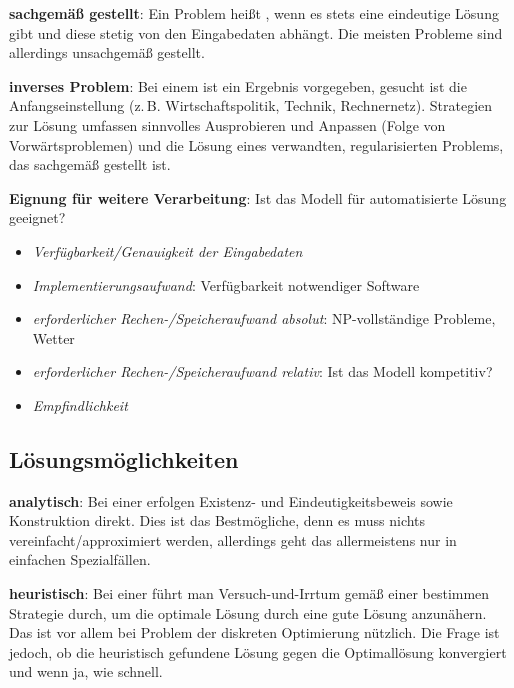 \textbf{sachgemäß gestellt}:
Ein Problem heißt , wenn es stets eine eindeutige Lösung gibt und
diese stetig von den Eingabedaten abhängt.
Die meisten Probleme sind allerdings unsachgemäß gestellt.

\textbf{inverses Problem}:
Bei einem  ist ein Ergebnis vorgegeben, gesucht ist die
Anfangseinstellung
(z.\,B. Wirtschaftspolitik, Technik, Rechnernetz).
Strategien zur Lösung umfassen sinnvolles Ausprobieren und Anpassen (Folge von Vorwärtsproblemen)
und die Lösung eines verwandten, regularisierten Problems, das sachgemäß gestellt ist.

\linie

\textbf{Eignung für weitere Verarbeitung}:
Ist das Modell für automatisierte Lösung geeignet?
\begin{itemize}
    \item
    \emph{Verfügbarkeit/Genauigkeit der Eingabedaten}

    \item
    \emph{Implementierungsaufwand}:
    Verfügbarkeit notwendiger Software

    \item
    \emph{erforderlicher Rechen-/Speicheraufwand absolut}:
    NP-vollständige Probleme, Wetter

    \item
    \emph{erforderlicher Rechen-/Speicheraufwand relativ}:
    Ist das Modell kompetitiv?

    \item
    \emph{Empfindlichkeit}
\end{itemize}

\subsection{%
    Lösungsmöglichkeiten%
}

\textbf{analytisch}:
Bei einer  erfolgen
Existenz- und Eindeutigkeitsbeweis sowie Konstruktion direkt.
Dies ist das Bestmögliche, denn es muss nichts vereinfacht/approximiert werden,
allerdings geht das allermeistens nur in einfachen Spezialfällen.

\textbf{heuristisch}:
Bei einer  führt man Versuch-und-Irrtum gemäß einer bestimmen
Strategie durch, um die optimale Lösung durch eine gute Lösung anzunähern.
Das ist vor allem bei Problem der diskreten Optimierung nützlich.
Die Frage ist jedoch, ob die heuristisch gefundene Lösung gegen die Optimallösung konvergiert
und wenn ja, wie schnell.

